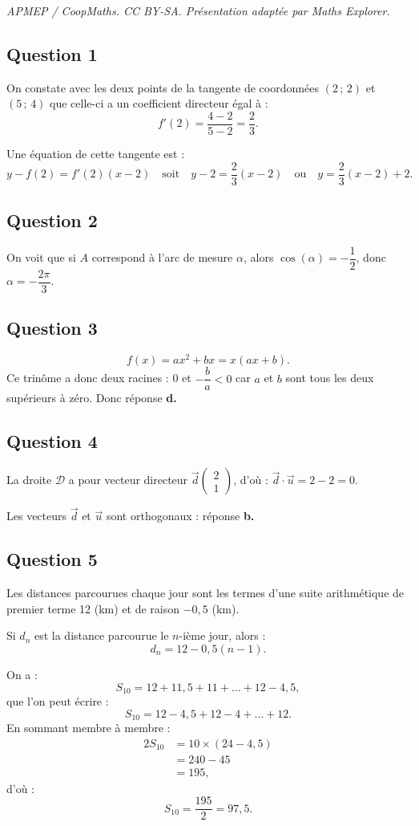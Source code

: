 \documentclass[10pt]{article}
\begin{document}
\noindent\textit{APMEP / CoopMaths. CC BY-SA. Présentation adaptée par Maths Explorer.}\par\medskip
\subsection*{Question 1}

On constate avec les deux points de la tangente de coordonnées \( (2\,;\,2) \) et \( (5\,;\,4) \) que celle-ci a un coefficient directeur égal à :
\[
f'(2) = \dfrac{4 - 2}{5 - 2} = \dfrac{2}{3}.
\]

Une équation de cette tangente est :
\[
y - f(2) = f'(2)(x - 2) \quad \text{soit} \quad y - 2 = \dfrac{2}{3}(x - 2) \quad \text{ou} \quad y = \dfrac{2}{3}(x - 2) + 2.
\]

\subsection*{Question 2}

On voit que si \( A \) correspond à l'arc de mesure \( \alpha \), alors \( \cos(\alpha) = -\dfrac{1}{2} \), donc \( \alpha = -\dfrac{2\pi}{3} \).

\subsection*{Question 3}

\[
f(x) = ax^2 + bx = x(ax + b).
\]
Ce trinôme a donc deux racines : 0 et \( -\dfrac{b}{a} < 0 \) car \( a \) et \( b \) sont tous les deux supérieurs à zéro. Donc réponse \textbf{d.}

\subsection*{Question 4}

La droite \( \mathcal{D} \) a pour vecteur directeur \( \vec{d} \begin{pmatrix} 2 \\ 1 \end{pmatrix} \), d'où : \(\vec{d} \cdot \vec{u} = 2 - 2 = 0\).

Les vecteurs \( \vec{d} \) et \( \vec{u} \) sont orthogonaux : réponse \textbf{b.}

\subsection*{Question 5}

Les distances parcourues chaque jour sont les termes d'une suite arithmétique de premier terme 12 (km) et de raison \(-0,5\) (km).

Si \( d_n \) est la distance parcourue le \( n \)-ième jour, alors :
\[
d_n = 12 - 0,5(n - 1).
\]

On a :
\[
S_{10} = 12 + 11{,}5 + 11 + \dots + 12 - 4{,}5,
\]
que l'on peut écrire :
\[
S_{10} = 12 - 4{,}5 + 12 - 4 + \dots + 12.
\]
En sommant membre à membre :
\begin{align*}
2S_{10} &= 10 \times (24 - 4{,}5) \\
&= 240 - 45 \\
&= 195,
\end{align*}
d'où :
\[
S_{10} = \dfrac{195}{2} = 97{,}5.
\]
\end{document}
